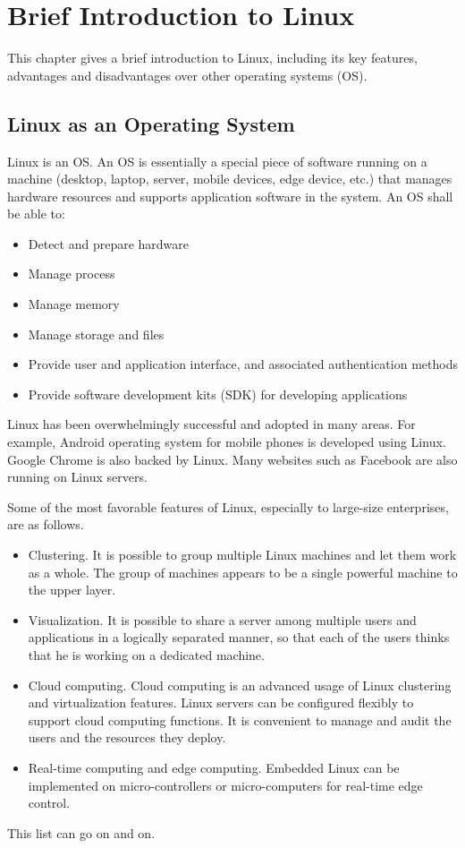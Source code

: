 \chapter{Brief Introduction to Linux}

This chapter gives a brief introduction to Linux, including its key features, advantages and disadvantages over other operating systems (OS).

\section{Linux as an Operating System}

Linux is an OS. An OS is essentially a special piece of software running on a machine (desktop, laptop, server, mobile devices, edge device, etc.) that manages hardware resources and supports application software in the system. An OS shall be able to:
\begin{itemize}
  \item Detect and prepare hardware
  \item Manage process
  \item Manage memory
  \item Manage storage and files
  \item Provide user and application interface, and associated authentication methods
  \item Provide software development kits (SDK) for developing applications
\end{itemize}

Linux has been overwhelmingly successful and adopted in many areas. For example, Android operating system for mobile phones is developed using Linux. Google Chrome is also backed by Linux. Many websites such as Facebook are also running on Linux servers.

Some of the most favorable features of Linux, especially to large-size enterprises, are as follows.
\begin{itemize}
  \item Clustering. It is possible to group multiple Linux machines and let them work as a whole. The group of machines appears to be a single powerful machine to the upper layer.
  \item Visualization. It is possible to share a server among multiple users and applications in a logically separated manner, so that each of the users thinks that he is working on a dedicated machine.
  \item Cloud computing. Cloud computing is an advanced usage of Linux clustering and virtualization features. Linux servers can be configured flexibly to support cloud computing functions. It is convenient to manage and audit the users and the resources they deploy. 
  \item Real-time computing and edge computing. Embedded Linux can be implemented on micro-controllers or micro-computers for real-time edge control.
\end{itemize}
This list can go on and on.


